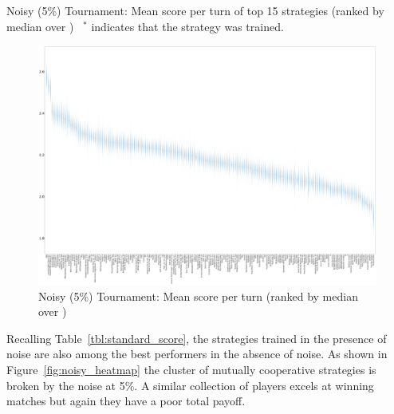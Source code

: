 \documentclass{article}
\begin{document}
\begin{table}[!hbtp]
    \centering
        
        \caption{Noisy (5\%) Tournament: Mean score per turn of top 15 strategies
        (ranked by median over
        \protecttournaments)
        ~$^{*}$ indicates that the strategy was trained.}
        \label{tbl:noisy_score}
\end{table}


\begin{landscape}
    \begin{figure}[!hbtp]
        \centering
        \includegraphics[width=\paperwidth]{./assets/noisy_scores_boxplots.pdf}
        \caption{Noisy (5\%) Tournament: Mean score per turn (ranked by median
        over
        \protecttournaments)}
        \label{fig:noisy_score}
    \end{figure}
\end{landscape}


Recalling Table~\ref{tbl:standard_score}, the strategies trained in the presence
of noise are also among the best performers in the absence of noise. As shown in
Figure~\ref{fig:noisy_heatmap} the cluster of mutually cooperative strategies is
broken by the noise at 5\%. A similar collection of players excels at winning
matches but again they have a poor total payoff.
\end{document}
